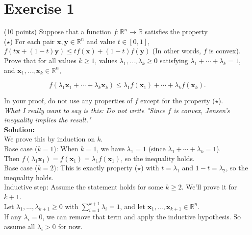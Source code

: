 \documentclass{article}
\begin{document}
\section*{Exercise 1}
(10 points) Suppose that a function $f: \mathbb{R}^n \to \mathbb{R}$ satisfies the property \\

($\star$) For each pair $\mathbf{x}, \mathbf{y} \in \mathbb{R}^n$ and value $t \in [0,1]$, $f(t\mathbf{x} + (1-t)\mathbf{y}) \leq tf(\mathbf{x}) + (1-t)f(\mathbf{y})$ (In other words, $f$ is convex). \\

Prove that for all values $k \geq 1$, values $\lambda_1,\ldots,\lambda_k \geq 0$ satisfying $\lambda_1 + \cdots + \lambda_k = 1$, and $\mathbf{x}_1,\ldots,\mathbf{x}_k \in \mathbb{R}^n$,

$$f(\lambda_1\mathbf{x}_1 + \cdots + \lambda_k\mathbf{x}_k) \leq \lambda_1f(\mathbf{x}_1) + \cdots + \lambda_kf(\mathbf{x}_k).$$

In your proof, do not use any properties of $f$ except for the property ($\star$). \\

\textit{What I really want to say is this: Do not write "Since $f$ is convex, Jensen's inequality implies the result."} \\

\textbf{Solution: } \\

We prove this by induction on $k$. \\

Base case ($k=1$): 
When $k=1$, we have $\lambda_1 = 1$ (since $\lambda_1 + \cdots + \lambda_k = 1$). \\
Then $f(\lambda_1\mathbf{x}_1) = f(\mathbf{x}_1) = \lambda_1f(\mathbf{x}_1)$, so the inequality holds. \\

Base case ($k=2$): 
This is exactly property ($\star$) with $t = \lambda_1$ and $1-t = \lambda_2$, so the inequality holds. \\

Inductive step: 
Assume the statement holds for some $k \geq 2$. We'll prove it for $k+1$. \\

Let $\lambda_1,\ldots,\lambda_{k+1} \geq 0$ with $\sum_{i=1}^{k+1} \lambda_i = 1$, and let $\mathbf{x}_1,\ldots,\mathbf{x}_{k+1} \in \mathbb{R}^n$. \\

If any $\lambda_i = 0$, we can remove that term and apply the inductive hypothesis. So assume all $\lambda_i > 0$ for now. \\
\end{document}
